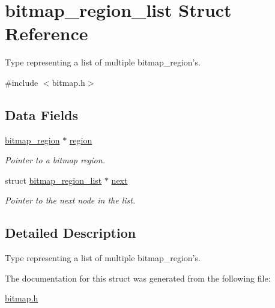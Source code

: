\hypertarget{structbitmap__region__list}{
\section{bitmap\_\-region\_\-list Struct Reference}
\label{structbitmap__region__list}
}


Type representing a list of multiple bitmap\_\-region's.  




{\ttfamily \#include $<$bitmap.h$>$}

\subsection*{Data Fields}
\begin{DoxyCompactItemize}
\item 
\hypertarget{structbitmap__region__list_a376bbf12235654517689131d4e1c5fa8}{
\hyperlink{structbitmap__region}{bitmap\_\-region} $\ast$ \hyperlink{structbitmap__region__list_a376bbf12235654517689131d4e1c5fa8}{region}}
\label{structbitmap__region__list_a376bbf12235654517689131d4e1c5fa8}

\begin{DoxyCompactList}\small\item\em Pointer to a bitmap region. \end{DoxyCompactList}\item 
\hypertarget{structbitmap__region__list_ad2aad40e3d47f131b7525a558d827f3d}{
struct \hyperlink{structbitmap__region__list}{bitmap\_\-region\_\-list} $\ast$ \hyperlink{structbitmap__region__list_ad2aad40e3d47f131b7525a558d827f3d}{next}}
\label{structbitmap__region__list_ad2aad40e3d47f131b7525a558d827f3d}

\begin{DoxyCompactList}\small\item\em Pointer to the next node in the list. \end{DoxyCompactList}\end{DoxyCompactItemize}


\subsection{Detailed Description}
Type representing a list of multiple bitmap\_\-region's. 

The documentation for this struct was generated from the following file:\begin{DoxyCompactItemize}
\item 
\hyperlink{bitmap_8h}{bitmap.h}\end{DoxyCompactItemize}

